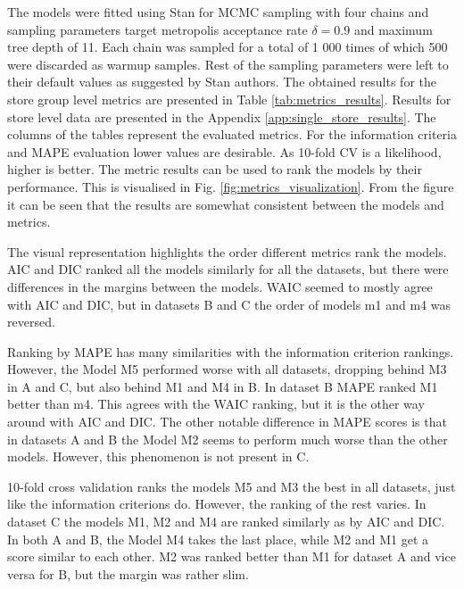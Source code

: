\documentclass[english, 12pt, a4paper, sci, utf8, a-1b, online]{aaltothesis}
\begin{document}
\begin{abstractpage}[english]


The models were fitted using Stan for MCMC sampling with four chains and sampling parameters target metropolis acceptance rate $\delta = 0.9$ and maximum tree depth of 11. Each chain was sampled for a total of 1 000 times of which 500 were discarded as warmup samples. Rest of the sampling parameters were left to their default values as suggested by Stan authors. The obtained results for the store group level metrics are presented in Table \ref{tab:metrics_results}. Results for store level data are presented in the Appendix \ref{app:single_store_results}. The columns of the tables represent the evaluated metrics. For the information criteria and MAPE evaluation lower values are desirable. As 10-fold CV is a likelihood, higher is better. The metric results can be used to rank the models by their performance. This is visualised in Fig. \ref{fig:metrics_visualization}. From the figure it can be seen that the results are somewhat consistent between the models and metrics.


The visual representation highlights the order different metrics rank the models. AIC and DIC ranked all the models similarly for all the datasets, but there were differences in the margins between the models. WAIC seemed to mostly agree with AIC and DIC, but in datasets B and C the order of models m1 and m4 was reversed. 

Ranking by MAPE has many similarities with the information criterion rankings. However, the Model M5 performed worse with all datasets, dropping behind M3 in A and C, but also behind M1 and M4 in B. In dataset B MAPE ranked M1 better than m4. This agrees with the WAIC ranking, but it is the other way around with AIC and DIC. The other notable difference in MAPE scores is that in datasets A and B the Model M2 seems to perform much worse than the other models. However, this phenomenon is not present in C. 

10-fold cross validation ranks the models M5 and M3 the best in all datasets, just like the information criterions do. However, the ranking of the rest varies. In dataset C the models M1, M2 and M4 are ranked similarly as by AIC and DIC. In both A and B, the Model M4 takes the last place, while M2 and M1 get a score similar to each other. M2 was ranked better than M1 for dataset A and vice versa for B, but the margin was rather slim.


\end{abstractpage}
\end{document}

